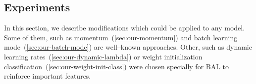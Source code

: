 \subsection{Experiments}
\label{sec:sim-exp} 

In this section, we describe modifications which could be applied to any model. Some of them, such as momentum~(\ref{sec:our-momentum}) and batch learning mode~(\ref{sec:our-batch-mode}) are well--known approaches. Other, such as dynamic learning rates~(\ref{sec:our-dynamic-lambda}) or weight initialization classification~(\ref{sec:our-weight-init-class}) were chosen specially for BAL to reinforce important features. 

 

 

 

 


